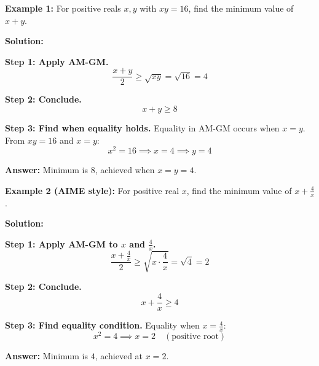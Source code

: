 \documentclass[12pt]{extarticle}
\begin{document}
\begin{examplebox}
\textbf{Example 1:} For positive reals $x, y$ with $xy = 16$, find the minimum value of $x + y$.

\textbf{Solution:}

\textbf{Step 1: Apply AM-GM.}
\[
\frac{x+y}{2} \ge \sqrt{xy} = \sqrt{16} = 4
\]

\textbf{Step 2: Conclude.}
\[
x + y \ge 8
\]

\textbf{Step 3: Find when equality holds.} Equality in AM-GM occurs when $x = y$. From $xy = 16$ and $x = y$:
\[
x^2 = 16 \implies x = 4 \implies y = 4
\]

\textbf{Answer:} Minimum is $\boxed{8}$, achieved when $x = y = 4$.
\end{examplebox}

\begin{examplebox}
\textbf{Example 2 (AIME style):} For positive real $x$, find the minimum value of $x + \frac{4}{x}$.

\textbf{Solution:}

\textbf{Step 1: Apply AM-GM to $x$ and $\frac{4}{x}$.}
\[
\frac{x + \frac{4}{x}}{2} \ge \sqrt{x \cdot \frac{4}{x}} = \sqrt{4} = 2
\]

\textbf{Step 2: Conclude.}
\[
x + \frac{4}{x} \ge 4
\]

\textbf{Step 3: Find equality condition.} Equality when $x = \frac{4}{x}$:
\[
x^2 = 4 \implies x = 2 \quad (\text{positive root})
\]

\textbf{Answer:} Minimum is $\boxed{4}$, achieved at $x = 2$.
\end{examplebox}
\end{document}

